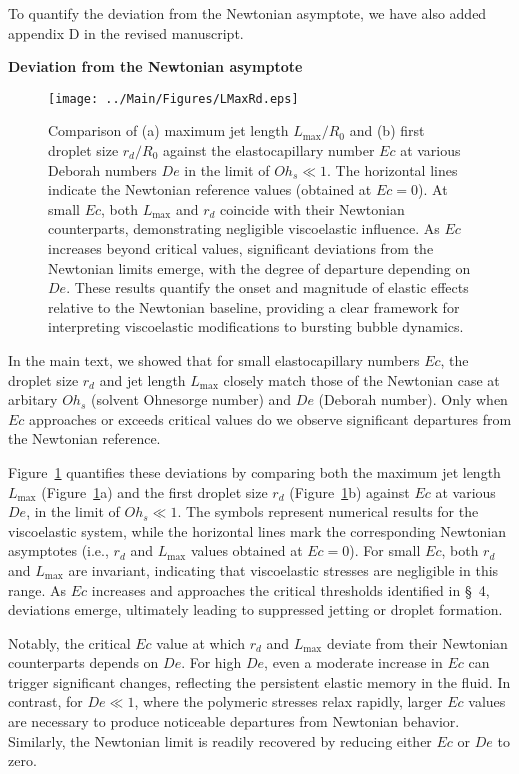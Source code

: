 \documentclass[]{article}
\newcommand{\oo}{\color{magenta} \normalfont}
\newcommand{\bb}{\color{black} \normalfont}
\begin{document}
\begin{enumerate}
        To quantify the deviation from the Newtonian asymptote, we have also added appendix D in the revised manuscript. 

        \oo
        \textbf{Deviation from the Newtonian asymptote}

        \begin{figure}
            \centering
            \texttt{[image: ../Main/Figures/LMaxRd.eps]}
            \caption{{\oo Comparison of (a) maximum jet length $L_{\text{max}}/R_0$ and (b) first droplet size $r_d/R_0$ against the elastocapillary number $Ec$ at various Deborah numbers $De$ in the limit of $Oh_s \ll 1$. The horizontal lines indicate the Newtonian reference values (obtained at $Ec=0$). At small $Ec$, both $L_{\text{max}}$ and $r_d$ coincide with their Newtonian counterparts, demonstrating negligible viscoelastic influence. As $Ec$ increases beyond critical values, significant deviations from the Newtonian limits emerge, with the degree of departure depending on $De$. These results quantify the onset and magnitude of elastic effects relative to the Newtonian baseline, providing a clear framework for interpreting viscoelastic modifications to bursting bubble dynamics.\bb}}
            \label{fig:devNewt}
        \end{figure}

        In the main text, we showed that for small elastocapillary numbers $Ec$, the droplet size $r_d$ and jet length $L_{\text{max}}$ closely match those of the Newtonian case at arbitary $Oh_s$ (solvent Ohnesorge number) and $De$ (Deborah number). Only when $Ec$ approaches or exceeds critical values do we observe significant departures from the Newtonian reference.

        Figure~\ref{fig:devNewt} quantifies these deviations by comparing both the maximum jet length $L_{\text{max}}$ (Figure~\ref{fig:devNewt}a) and the first droplet size $r_d$ (Figure~\ref{fig:devNewt}b) against $Ec$ at various $De$, in the limit of $Oh_s \ll 1$. The symbols represent numerical results for the viscoelastic system, while the horizontal lines mark the corresponding Newtonian asymptotes (i.e., $r_d$ and $L_{\text{max}}$ values obtained at $Ec=0$). For small $Ec$, both $r_d$ and $L_{\text{max}}$ are invariant, indicating that viscoelastic stresses are negligible in this range. As $Ec$ increases and approaches the critical thresholds identified in \S~4, deviations emerge, ultimately leading to suppressed jetting or droplet formation.

        Notably, the critical $Ec$ value at which $r_d$ and $L_{\text{max}}$ deviate from their Newtonian counterparts depends on $De$. For high $De$, even a moderate increase in $Ec$ can trigger significant changes, reflecting the persistent elastic memory in the fluid. In contrast, for $De \ll 1$, where the polymeric stresses relax rapidly, larger $Ec$ values are necessary to produce noticeable departures from Newtonian behavior. Similarly, the Newtonian limit is readily recovered by reducing either $Ec$ or $De$ to zero.


\end{enumerate}
\end{document}
